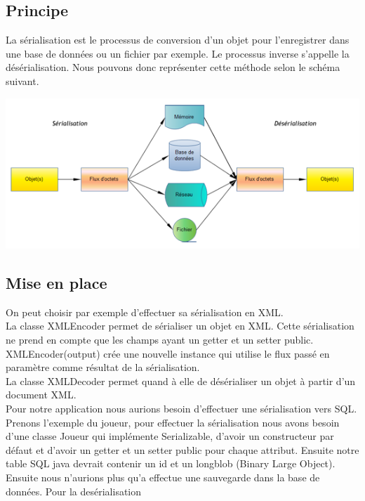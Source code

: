 \subsection{Principe}

La sérialisation est le processus de conversion d'un objet pour l'enregistrer dans une base de données ou un fichier par exemple. Le processus inverse s'appelle la désérialisation. Nous pouvons donc représenter cette méthode selon le schéma suivant. 

\begin{center}
\includegraphics[scale=0.5]{../graph/serialisation.png} \\
\end{center}

\subsection{Mise en place}
On peut choisir par exemple d'effectuer sa sérialisation en XML. \\

La classe XMLEncoder permet de sérialiser un objet en XML. Cette sérialisation ne prend en compte que les champs ayant un getter et un setter public. XMLEncoder(output) crée une nouvelle instance qui utilise le flux passé en paramètre comme résultat de la sérialisation. \\

La classe XMLDecoder permet quand à elle de désérialiser un objet à partir d'un document XML. \\

Pour notre application nous aurions besoin d'effectuer une sérialisation vers SQL. Prenons l'exemple du joueur, pour effectuer la sérialisation nous avons besoin d'une classe Joueur qui implémente Serializable, d'avoir un constructeur par défaut et d'avoir un getter et un setter public pour chaque attribut. Ensuite notre table SQL java devrait contenir un id et un longblob (Binary Large Object). Ensuite nous n'aurions plus qu'a effectue une sauvegarde dans la base de données. Pour la desérialisation 


